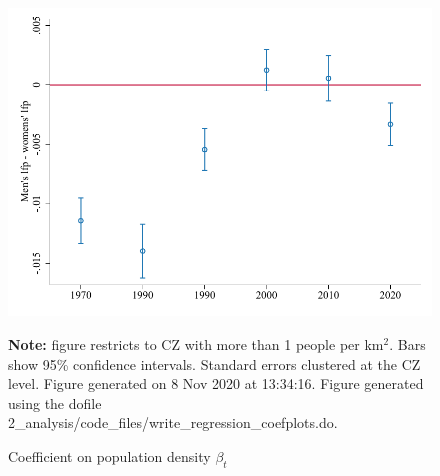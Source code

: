 \begin{figure}[!h]
\centering
\caption{Coefficient on population density $ \beta_t $}
\includegraphics[width=1\textwidth]{../2_analysis/output/figures/lfp_gap_full_time}
\par \begin{minipage}[h]{\textwidth}{\tiny\textbf{Note:} figure restricts to CZ with more than 1 people per km$^2$. Bars show 95\% confidence intervals. Standard errors clustered at the CZ level. Figure generated on  8 Nov 2020 at 13:34:16. Figure generated using the dofile 2\_analysis/code\_files/write\_regression\_coefplots.do.}\end{minipage}
\end{figure}
